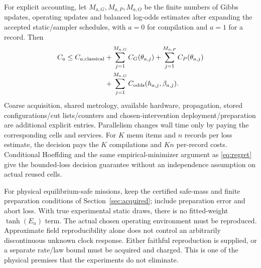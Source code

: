 For explicit accounting, let $M_{a,G},M_{a,P},M_{a,O}$ be the finite
numbers of Gibbs updates, operating updates and balanced log-odds
estimates after expanding the accepted static/sampler schedules, with
$a=0$ for compilation and $a=1$ for a record. Then
\begin{equation}
\begin{split}
C_a\le C_{a,\rm classical}
&+\sum_{j=1}^{M_{a,G}}C_G(\theta_{a,j})
+\sum_{j=1}^{M_{a,P}}C_P(\theta_{a,j})\\
&+\sum_{j=1}^{M_{a,O}}C_{\rm odds}(h_{a,j},\beta_{a,j}).
\end{split}
\label{eq:physicalLedger}
\end{equation}
Coarse acquisition, shared metrology, available hardware, propagation,
stored configurations/cut lists/counters and chosen-intervention
deployment/preparation are additional explicit entries. Parallelism
changes wall time only by paying the corresponding cells and services.
For $K$ menu items and $n$ records per loss estimate, the decision pays
the $K$ compilations and $Kn$ per-record costs. Conditional Hoeffding
and the same empirical-minimizer argument as \eqref{eq:regret} give
the bounded-loss decision guarantee without an independence assumption
on actual reused cells.

For physical equilibrium-safe missions, keep the certified safe-mass
and finite preparation conditions of Section~\ref{sec:acquired}; include
preparation error and abort loss. With true experimental static draws,
there is no fitted-weight $\tanh(E_u)$ term. The actual chosen operating
environment must be reproduced. Approximate field reproducibility alone
does not control an arbitrarily discontinuous unknown clock response.
Either faithful reproduction is supplied, or a separate rate/law bound
must be acquired and charged. This is one of the physical premises
that the experiments do not eliminate.

